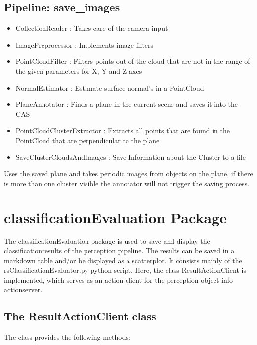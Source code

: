\documentclass[main.tex]{subfiles}
\begin{document}
			\subsection{Pipeline: save\_images}
\begin{itemize}
	\item CollectionReader : Takes care of the camera input
	\item ImagePreprocessor : Implements image filters  
	\item PointCloudFilter : Filters points out of the cloud that are not in the range of the given parameters for X, Y and Z axes
	\item NormalEstimator : Estimate surface normal's in a PointCloud 
	\item PlaneAnnotator : Finds a plane in the current scene and saves it into the CAS
	\item PointCloudClusterExtractor : Extracts all points that are found in the PointCloud that are perpendicular to the plane 
	\item SaveClusterCloudsAndImages : Save Information about the Cluster to a file 
\end{itemize}
Uses the saved plane and takes periodic images from objects on the plane, if there is more than one cluster visible the annotator will not trigger the saving process.

\section{classificationEvaluation Package}

The classificationEvaluation package is used to save and display the classificationresults of the perception pipeline. The results can be saved in a markdown table and/or be displayed as a scatterplot. It consists mainly of the rsClassificationEvaluator.py python script. Here, the class ResultActionClient is implemented, which serves as an action client for the perception object info actionserver.\\

\subsection{The ResultActionClient class}
The class provides the following methods:
\end{document}
